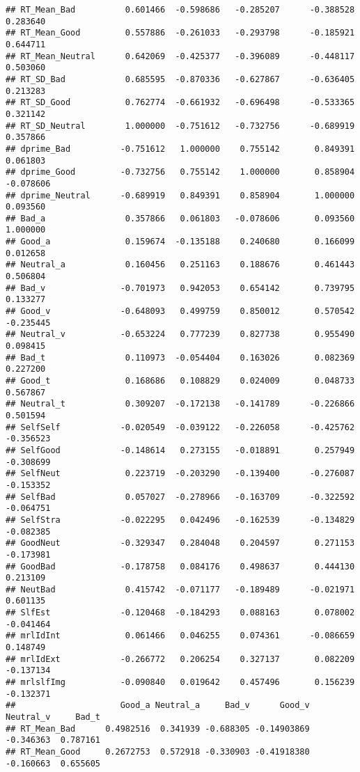 \documentclass[man]{apa6}
\begin{document}
\begin{verbatim}
## RT_Mean_Bad          0.601466  -0.598686   -0.285207      -0.388528  0.283640
## RT_Mean_Good         0.557886  -0.261033   -0.293798      -0.185921  0.644711
## RT_Mean_Neutral      0.642069  -0.425377   -0.396089      -0.448117  0.503060
## RT_SD_Bad            0.685595  -0.870336   -0.627867      -0.636405  0.213283
## RT_SD_Good           0.762774  -0.661932   -0.696498      -0.533365  0.321142
## RT_SD_Neutral        1.000000  -0.751612   -0.732756      -0.689919  0.357866
## dprime_Bad          -0.751612   1.000000    0.755142       0.849391  0.061803
## dprime_Good         -0.732756   0.755142    1.000000       0.858904 -0.078606
## dprime_Neutral      -0.689919   0.849391    0.858904       1.000000  0.093560
## Bad_a                0.357866   0.061803   -0.078606       0.093560  1.000000
## Good_a               0.159674  -0.135188    0.240680       0.166099  0.012658
## Neutral_a            0.160456   0.251163    0.188676       0.461443  0.506804
## Bad_v               -0.701973   0.942053    0.654142       0.739795  0.133277
## Good_v              -0.648093   0.499759    0.850012       0.570542 -0.235445
## Neutral_v           -0.653224   0.777239    0.827738       0.955490  0.098415
## Bad_t                0.110973  -0.054404    0.163026       0.082369  0.227200
## Good_t               0.168686   0.108829    0.024009       0.048733  0.567867
## Neutral_t            0.309207  -0.172138   -0.141789      -0.226866  0.501594
## SelfSelf            -0.020549  -0.039122   -0.226058      -0.425762 -0.356523
## SelfGood            -0.148614   0.273155   -0.018891       0.257949 -0.308699
## SelfNeut             0.223719  -0.203290   -0.139400      -0.276087 -0.153352
## SelfBad              0.057027  -0.278966   -0.163709      -0.322592 -0.064751
## SelfStra            -0.022295   0.042496   -0.162539      -0.134829 -0.082385
## GoodNeut            -0.329347   0.284048    0.204597       0.271153 -0.173981
## GoodBad             -0.178758   0.084176    0.498637       0.444130  0.213109
## NeutBad              0.415742  -0.071177   -0.189489      -0.021971  0.601135
## SlfEst              -0.120468  -0.184293    0.088163       0.078002 -0.041464
## mrlIdInt             0.061466   0.046255    0.074361      -0.086659  0.148749
## mrlIdExt            -0.266772   0.206254    0.327137       0.082209 -0.137134
## mrlslfImg           -0.090840   0.019642    0.457496       0.156239 -0.132371
##                     Good_a Neutral_a     Bad_v      Good_v Neutral_v     Bad_t
## RT_Mean_Bad      0.4982516  0.341939 -0.688305 -0.14903869 -0.346363  0.787161
## RT_Mean_Good     0.2672753  0.572918 -0.330903 -0.41918380 -0.160663  0.655605

\end{verbatim}
\end{document}
